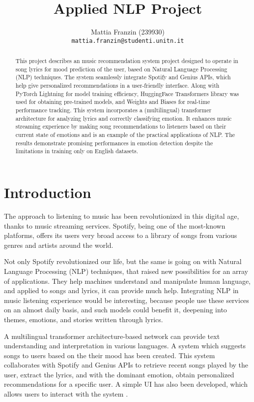 \documentclass[11pt]{article}
\title{Applied NLP Project}
\author{Mattia Franzin (239930) \\
  \texttt{mattia.franzin@studenti.unitn.it} \\}
\begin{document}
\maketitle
\begin{abstract}
This project describes an music recommendation system project designed to operate in song lyrics for mood prediction of the user, based on Natural Language Processing (NLP) techniques. The system seamlessly integrate Spotify and Genius APIs, which help give personalized recommendations in a user-friendly interface. Along with PyTorch Lightning for model training efficiency, HuggingFace Transformers library was used for obtaining pre-trained models, and Weights and Biases for real-time performance tracking. This system incorporates a (multilingual) transformer architecture for analyzing lyrics and correctly classifying emotion. It enhances music streaming experience by making song recommendations to listeners based on their current state of emotions and is an example of the practical applications of NLP. The results demonstrate promising performances in emotion detection despite the limitations in training only on English datasets. 
\end{abstract}

\section{Introduction}

The approach to listening to music has been revolutionized in this digital age, thanks to music streaming services. Spotify, being one of the most-known platforms, offers its users very broad access to a library of songs from various genres and artists around the world. 

Not only Spotify revolutionized our life, but the same is going on with Natural Language Processing (NLP) techniques, that raised new possibilities for an array of applications. They help machines understand and manipulate human language, and applied to songs and lyrics, it can provide much help. Integrating NLP in music listening experience would be interesting, because people use these services on an almost daily basis, and such models could benefit it, deepening into themes, emotions, and stories written through lyrics.

A multilingual transformer architecture-based network can provide text understanding and interpretation in various languages. A system which suggests songs to users based on the their mood has been created. This system collaborates with Spotify and Genius APIs to retrieve recent songs played by the user, extract the lyrics, and with the dominant emotion, obtain personalized recommendations for a specific user. A simple UI has also been developed, which allows users to interact with the system .
\end{document}
